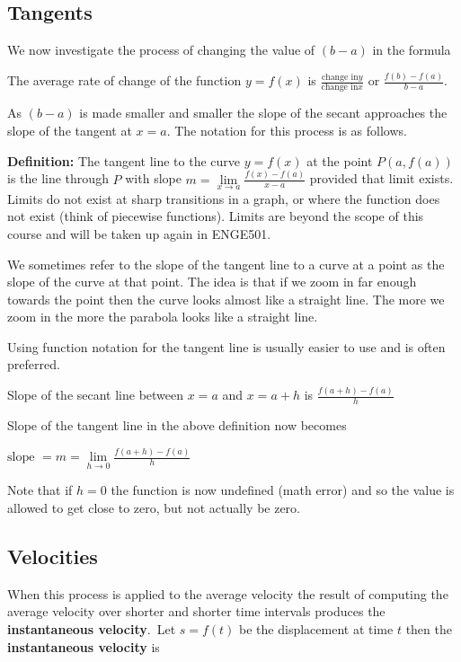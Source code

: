\subsection*{Tangents}
We now investigate the process of changing the value of $(b -a)$ in the formula 

The average rate of change of the function
$y =f (x)$ is $\frac{\text{change in}y}{\text{change in}x}$ or $\frac{f (b) -f (a)}{b -a}$. 

As $(b -a)$ is made smaller and smaller the slope of the secant approaches the slope of the tangent at $x =a$. The notation for this process is as follows. 

\textbf{Definition:} The tangent line to the curve $y =f (x)$ at the point $P (a ,f (a))$ is the line through $P$ with slope $m =\underset{x \rightarrow a}{\lim }\frac{f (x) -f (a)}{x -a}$ provided that limit exists. Limits do not exist at sharp transitions in a graph, or where the function does not exist (think of piecewise functions). Limits are beyond the scope of this course and will be taken up again in ENGE501.

We sometimes refer to the slope of the tangent line to a curve at a point as the slope of the curve at that point. The idea is that if we zoom in far enough towards the point then the curve looks almost like a straight line. The more we zoom in the more the parabola looks like a straight line. 

Using function notation for the tangent line is usually easier to use and is often preferred. 

Slope of the secant line between $x =a$ and $x =a +h$ is $\displaystyle \frac{f (a +h) -f (a)}{h}$ 

Slope of the tangent line in the above definition now becomes

\begin{tcolorbox}
\begin{center}
$\text{slope }=m =\underset{h \rightarrow 0}{\lim }\frac{f (a +h) -f (a)}{h}$
\end{center}
\end{tcolorbox}
Note that if $h=0$ the function is now undefined (math error) and so the value is allowed to get close to zero, but not actually be zero.

\subsection*{Velocities}
When this process is applied to the average velocity the result of computing the average velocity over shorter and shorter time intervals produces the \textbf{instantaneous velocity}.\ Let $s =f (t)$ be the displacement at time $t$ then the \textbf{instantaneous velocity} is 

